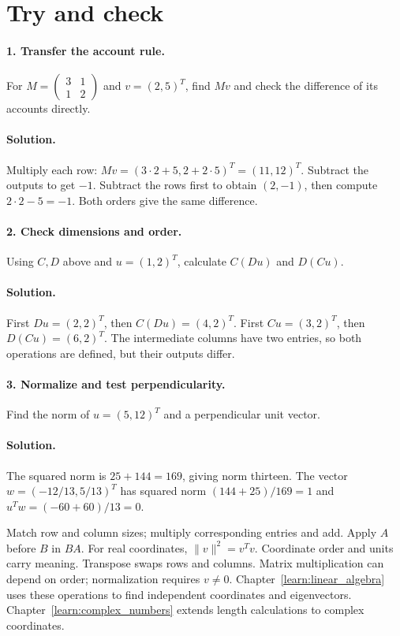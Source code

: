 \section{Try and check}
\paragraph{1. Transfer the account rule.}
For $M=\begin{pmatrix}3&1\\1&2\end{pmatrix}$ and $v=(2,5)^T$,
find $Mv$ and check the difference of its accounts directly.
\paragraph{Solution.}
Multiply each row: $Mv=(3\cdot2+5,2+2\cdot5)^T=(11,12)^T$.
Subtract the outputs to get $-1$. Subtract the rows first to obtain
$(2,-1)$, then compute $2\cdot2-5=-1$. Both orders give the same difference.

\paragraph{2. Check dimensions and order.}
Using $C,D$ above and $u=(1,2)^T$, calculate $C(Du)$ and $D(Cu)$.
\paragraph{Solution.}
First $Du=(2,2)^T$, then $C(Du)=(4,2)^T$.
First $Cu=(3,2)^T$, then $D(Cu)=(6,2)^T$. The intermediate columns
have two entries, so both operations are defined, but their outputs differ.

\paragraph{3. Normalize and test perpendicularity.}
Find the norm of $u=(5,12)^T$ and a perpendicular unit vector.
\paragraph{Solution.}
The squared norm is $25+144=169$, giving norm thirteen.
The vector $w=(-12/13,5/13)^T$ has squared norm
$(144+25)/169=1$ and $u^Tw=(-60+60)/13=0$.


\lessonreference
{Match row and column sizes; multiply corresponding entries and add.
Apply $A$ before $B$ in $BA$. For real coordinates, $\|v\|^2=v^Tv$.}
{Coordinate order and units carry meaning. Transpose swaps rows and columns.
Matrix multiplication can depend on order; normalization requires $v\ne0$.}
{Chapter~\ref{learn:linear_algebra} uses these operations to find independent
coordinates and eigenvectors. Chapter~\ref{learn:complex_numbers} extends
length calculations to complex coordinates.}

